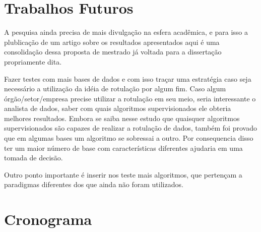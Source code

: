\section*{Trabalhos Futuros}

A pesquisa ainda precisa de mais divulgação na esfera acadêmica, e para isso a plublicação de um artigo sobre os resultados apresentados aqui é uma consolidação dessa proposta de mestrado já voltada para a dissertação propriamente dita.

Fazer testes com mais bases de dados  e com isso traçar uma estratégia caso seja necessário a utilização da idéia de rotulação por algum fim. Caso algum órgão/setor/empresa precise utilizar a rotulação em seu meio, seria interessante o analista de dados,  saber com quais algoritmos supervisionados ele obteria melhores resultados. Embora se saiba nesse estudo que quaisquer algoritmos supervisionados são capazes de realizar a rotulação de dados, também foi provado que em algumas bases um algoritmo se sobressai a outro. Por consequencia disso ter um maior número de base com características diferentes ajudaria em uma tomada de decisão.

Outro ponto importante é inserir nos teste mais algoritmos, que pertençam a  paradigmas diferentes dos que ainda não foram utilizados. 



\section*{Cronograma}

